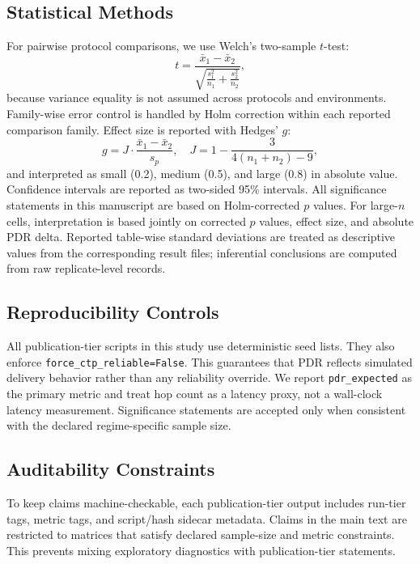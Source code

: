 ﻿\documentclass[sensors,article,submit,moreauthors,pdftex]{Definitions/mdpi}
\begin{document}
\subsection{Statistical Methods}
For pairwise protocol comparisons, we use Welch's two-sample $t$-test:
\begin{equation}
t=\frac{\bar{x}_1-\bar{x}_2}{\sqrt{\frac{s_1^2}{n_1}+\frac{s_2^2}{n_2}}},
\end{equation}
because variance equality is not assumed across protocols and environments. Family-wise error control is handled by Holm correction within each reported comparison family. Effect size is reported with Hedges' $g$:
\begin{equation}
g = J\cdot\frac{\bar{x}_1-\bar{x}_2}{s_p},\quad
J=1-\frac{3}{4(n_1+n_2)-9},
\end{equation}
and interpreted as small (0.2), medium (0.5), and large (0.8) in absolute value. Confidence intervals are reported as two-sided 95\% intervals. All significance statements in this manuscript are based on Holm-corrected $p$ values. For large-$n$ cells, interpretation is based jointly on corrected $p$ values, effect size, and absolute PDR delta. Reported table-wise standard deviations are treated as descriptive values from the corresponding result files; inferential conclusions are computed from raw replicate-level records.

\subsection{Reproducibility Controls}
All publication-tier scripts in this study use deterministic seed lists. They also enforce \texttt{force\_ctp\_reliable=False}. This guarantees that PDR reflects simulated delivery behavior rather than any reliability override. We report \texttt{pdr\_expected} as the primary metric and treat hop count as a latency proxy, not a wall-clock latency measurement. Significance statements are accepted only when consistent with the declared regime-specific sample size.

\subsection{Auditability Constraints}
To keep claims machine-checkable, each publication-tier output includes run-tier tags, metric tags, and script/hash sidecar metadata. Claims in the main text are restricted to matrices that satisfy declared sample-size and metric constraints. This prevents mixing exploratory diagnostics with publication-tier statements.
\end{document}
